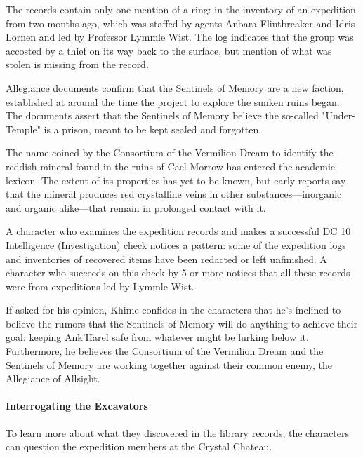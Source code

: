\documentclass[10pt,a4paper,twoside,bg=print,twocolumn,openany,nodeprecatedcode]{dndbook}
\begin{document}
\begin{description}[nolistsep]
\item[Expeditions to Cael Morrow.]
The records contain only one mention of a ring: in the inventory of an expedition from two months ago, which was staffed by agents Anbara Flintbreaker and Idris Lornen and led by Professor Lymmle Wist. The log indicates that the group was accosted by a thief on its way back to the surface, but mention of what was stolen is missing from the record.
\item[Sentinels of Memory.]
Allegiance documents confirm that the Sentinels of Memory are a new faction, established at around the time the project to explore the sunken ruins began. The documents assert that the Sentinels of Memory believe the so-called "Under-Temple" is a prison, meant to be kept sealed and forgotten.
\item[Ruidium.]
The name coined by the Consortium of the Vermilion Dream to identify the reddish mineral found in the ruins of Cael Morrow has entered the academic lexicon. The extent of its properties has yet to be known, but early reports say that the mineral produces red crystalline veins in other substances—inorganic and organic alike—that remain in prolonged contact with it.
\end{description}

A character who examines the expedition records and makes a successful DC 10 Intelligence (Investigation) check notices a pattern: some of the expedition logs and inventories of recovered items have been redacted or left unfinished. A character who succeeds on this check by 5 or more notices that all these records were from expeditions led by Lymmle Wist.

If asked for his opinion, Khime confides in the characters that he's inclined to believe the rumors that the Sentinels of Memory will do anything to achieve their goal: keeping Ank'Harel safe from whatever might be lurking below it. Furthermore, he believes the Consortium of the Vermilion Dream and the Sentinels of Memory are working together against their common enemy, the Allegiance of Allsight.

\paragraph{Interrogating the Excavators}
To learn more about what they discovered in the library records, the characters can question the expedition members at the Crystal Chateau.
\end{document}
